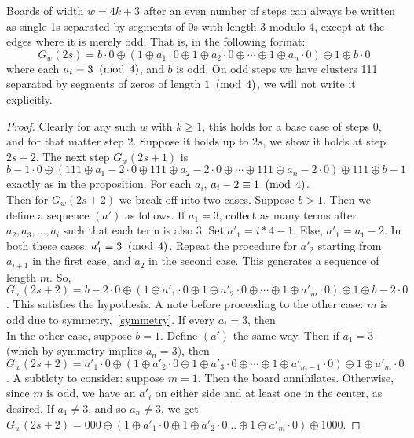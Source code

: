 \documentclass[12pt,letterpaper]{article}
\begin{document}
\begin{prop}\label{onesSepByOddZeros} %
  Boards of width $w=4k+3$ after an even number of steps can always be written as single 1s separated by segments of 0s with length 3 modulo 4, except at the edges where it is merely odd. That is, in the following format:
  $$G_w(2s)=b\cdot 0 \oplus (1 \oplus a_1\cdot 0 \oplus 1\oplus a_2\cdot 0\oplus\cdots \oplus 1\oplus a_n\cdot 0) \oplus 1 \oplus b\cdot 0$$
  where each $a_i\equiv 3 \;\;(\operatorname{mod}\;4)$, and $b$ is odd.
  On odd steps we have clusters 111 separated by segments of zeros of length $1\;\;(\operatorname{mod}\;4)$, we will not write it explicitly.
\end{prop}
\begin{proof}
  Clearly for any such $w$ with $k\geq 1$, this holds for a base case of steps 0, and for that matter step 2. Suppose it holds up to $2s$, we show it holds at step $2s+2$. The next step $G_w(2s+1)$ is $$b-1\cdot 0\oplus (111\oplus a_1-2\cdot 0 \oplus 111\oplus a_2-2\cdot 0\oplus\cdots\oplus 111 \oplus a_n-2\cdot 0)\oplus 111 \oplus b-1$$ exactly as in the proposition. For each $a_i$, $a_i-2\equiv 1 \;\;(\operatorname{mod}\;4)$. \\
  Then for $G_w(2s+2)$ we break off into two cases. Suppose $b>1$. Then we define a sequence $(a')$ as follows. If $a_1=3$, collect as many terms after $a_2,a_3,\dots,a_i$ such that each term is also 3. Set $a'_1=i*4-1$. Else, $a'_1=a_1-2$. In both these cases, $a'_1\equiv 3 \;\;(\operatorname{mod}\;4)$. Repeat the procedure for $a'_2$ starting from $a_{i+1}$ in the first case, and $a_2$ in the second case. This generates a sequence of length $m$. So, $G_w(2s+2) = b-2\cdot 0\oplus (1\oplus a'_1\cdot 0\oplus 1 \oplus a'_2\cdot 0 \oplus\cdots\oplus 1\oplus a'_m\cdot 0)\oplus 1\oplus b-2\cdot 0$. This satisfies the hypothesis. A note before proceeding to the other case: $m$ is odd due to symmetry,~\cref{symmetry}. If every $a_i=3$, then  \\
  In the other case, suppose $b=1$. Define $(a')$ the same way. Then if $a_1=3$ (which by symmetry implies $a_n=3$), then $G_w(2s+2)= a'_1\cdot 0\oplus (1\oplus a'_2\cdot 0\oplus 1\oplus a'_3\cdot 0\oplus\cdots\oplus 1\oplus a'_{m-1}\cdot 0)\oplus 1\oplus a'_m\cdot 0$. A subtlety to consider: suppose $m=1$. Then the board annihilates. Otherwise, since $m$ is odd, we have an $a'_i$ on either side and at least one in the center, as desired. 
  If $a_1\neq 3$, and so $a_n\neq 3$, we get $G_w(2s+2) = 000\oplus(1\oplus a'_1\cdot 0\oplus 1\oplus a'_2\cdot 0\dots\oplus 1\oplus a'_m\cdot 0)\oplus 1000$. 
\end{proof}
\end{document}
